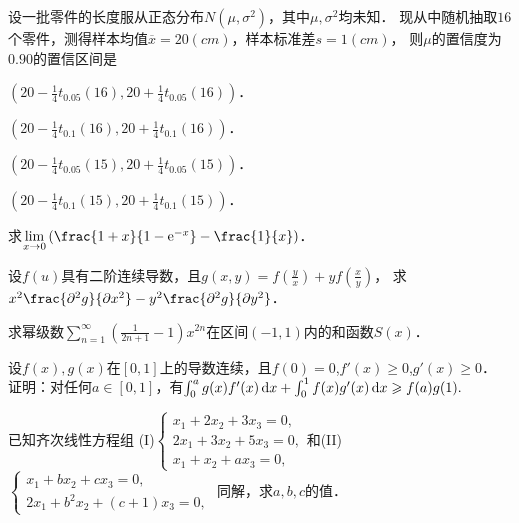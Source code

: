 \documentclass[plain,noanswer,medmath]{../../template/jnuexam}
\begin{document}


\begin{problem}
设一批零件的长度服从正态分布$N(\mu ,\sigma^2)$，其中$\mu ,\sigma^2$均未知．
现从中随机抽取$16$个零件，测得样本均值$\overline{x} = 20(cm)$，样本标准差$s = 1(cm)$，
则$\mu$的置信度为$0.90$的置信区间是\pickout{}
\begin{abcd}
\item $\left(20 - \frac{1}{4}t_{0.05}(16),20 + \frac{1}{4}t_{0.05}(16) \right)$．
\item $\left(20 - \frac{1}{4}t_{0.1}(16),20 + \frac{1}{4}t_{0.1}(16) \right)$．
\item $\left(20 - \frac{1}{4}t_{0.05}(15),20 + \frac{1}{4}t_{0.05}(15) \right)$．
\item $\left(20 - \frac{1}{4}t_{0.1}(15),20 + \frac{1}{4}t_{0.1}(15) \right)$．
\end{abcd}
\end{problem}




\begin{problem}[points=8]
求$\lim_{x \to 0} \left(\frac{1 + x}{1 - \e^{- x}} - \frac{1}{x} \right)$．
\end{problem}


\begin{problem}[points=8]
设$f(u)$具有二阶连续导数，且$g(x,y) = f\left(\frac{y}{x} \right) + yf\left(\frac{x}{y} \right)$，
求$x^2\frac{\pd^2 g}{\pd x^2} - y^2\frac{\pd^2 g}{\pd y^2}$．
\end{problem}




\begin{problem}[points=9]
求幂级数$\sum_{n = 1}^{\infty}\left(\frac{1}{2n + 1} - 1 \right) x^{2n}$在区间$(- 1,1)$内的和函数$S(x)$．
\end{problem}


\begin{problem}[points=8]
设$f(x),g(x)$在$[0,1]$上的导数连续，且$f(0) = 0$,$f'(x) \ge 0$,$g'(x) \ge 0$．
证明：对任何$a \in[0,1]$，有$\int_0^a g(x)f'(x)\mathop{}\!\mathrm{d} x + \int_0^1 f(x)g'(x)\mathop{}\!\mathrm{d} x \geqslant f(a)g(1).$
\end{problem}


\begin{problem}[points=13]
已知齐次线性方程组
(I)$\begin{cases}
  x_1 + 2x_2 + 3x_3 = 0, \\
  2x_1 + 3x_2 + 5x_3 = 0, \\
  x_1 + x_2 + ax_3 = 0,
\end{cases}$和(II)$\begin{cases}
  x_1 + bx_2 + cx_3 = 0, \\
  2x_1 + b^2x_2 + (c + 1)x_3 = 0,
\end{cases}$
同解，求$a,b,c$的值．
\end{problem}
\end{document}
